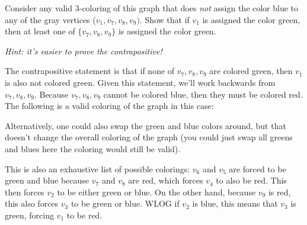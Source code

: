 \documentclass[11pt]{article}
\begin{document}
\begin{subparts}
Consider any valid 3-coloring of this graph that does \textit{not} assign the color blue to any of the gray vertices ($v_1, v_7, v_8, v_9)$. Show that if $v_1$ is assigned the color green, then at least one of $\{v_7, v_8, v_9\}$ is assigned the color green.

\textit{Hint: it's easier to prove the contrapositive!}

\begin{solution}
	The contrapositive statement is that if none of \( v_7, v_8, v_9 \) are colored green, then \( v_1 \) is 
	also not colored green. Given this statement, we'll work backwards from \( v_7, v_8, v_9 \). Because
	\( v_7, v_8, v_9 \) cannot be colored blue, then they must be colored red. The following 
	is a valid coloring of the graph in this case:

	\begin{center}
	\end{center}
	Alternatively, one could also swap the green and blue colors around, but that doesn't change the overall 
	coloring of the graph (you could just swap all greens and blues here the coloring would still be valid).

	This is also an exhaustive list of possible colorings: \( v_6 \) and \( v_5 \) are forced to be 
	green and blue because \( v_7 \) and \( v_8 \) are red, which forces \( v_4  \) to also be red. This then 
	forces \( v_2  \) to be either green or blue. On the other hand, because  \( v_9 \) is red, this also forces 
	\( v_3  \) to be green or blue. WLOG if \( v_2  \) is blue, this means that \( v_3 \) is green, forcing 
	\( v_1 \) to be red. 
\end{solution}


\end{subparts}
\end{document}

